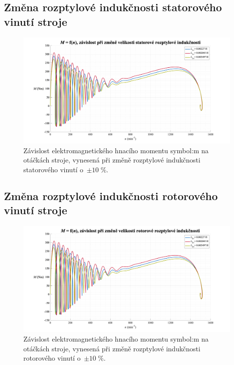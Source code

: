 \documentclass[a4paper, twoside, 11pt]{article}
\newcommand{\fbar}{\FloatBarrier}
\begin{document}
    \fbar
    \subsection{Změna rozptylové indukčnosti statorového vinutí stroje}
        \begin{figure}[htbp!]
            \centering
            \includegraphics[width=1\textwidth]{src/png/mh_dyn_nGraphL1sigma.png}
            \caption{Závislost elektromagnetického hnacího momentu \gls{symbol:m} na otáčkách stroje, vynesená při změně rozptylové indukčnosti statorového vinutí o~$\pm 10\;\%$.}
            \label{fig:mh_dyn_nGraphL1sigma}
        \end{figure}

    \newpage
    \fbar
    \subsection{Změna rozptylové indukčnosti rotorového vinutí stroje}
        \begin{figure}[htbp!]
            \centering
            \includegraphics[width=1\textwidth]{src/png/mh_dyn_nGraphL2sigma.png}
            \caption{Závislost elektromagnetického hnacího momentu \gls{symbol:m} na otáčkách stroje, vynesená při změně rozptylové indukčnosti rotorového vinutí o~$\pm 10\;\%$.}
            \label{fig:mh_dyn_nGraphL2sigma}
        \end{figure}
\end{document}
